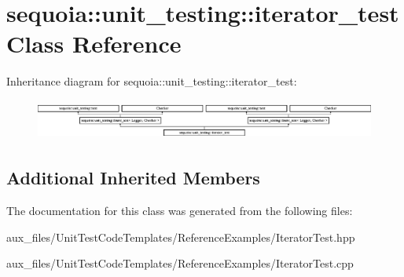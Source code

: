 \hypertarget{classsequoia_1_1unit__testing_1_1iterator__test}{}\section{sequoia\+::unit\+\_\+testing\+::iterator\+\_\+test Class Reference}
\label{classsequoia_1_1unit__testing_1_1iterator__test}
Inheritance diagram for sequoia\+::unit\+\_\+testing\+::iterator\+\_\+test\+:\begin{figure}[H]
\begin{center}
\leavevmode
\includegraphics[height=1.333333cm]{classsequoia_1_1unit__testing_1_1iterator__test}
\end{center}
\end{figure}
\subsection*{Additional Inherited Members}


The documentation for this class was generated from the following files\+:\begin{DoxyCompactItemize}
\item 
aux\+\_\+files/\+Unit\+Test\+Code\+Templates/\+Reference\+Examples/Iterator\+Test.\+hpp\item 
aux\+\_\+files/\+Unit\+Test\+Code\+Templates/\+Reference\+Examples/Iterator\+Test.\+cpp\end{DoxyCompactItemize}

